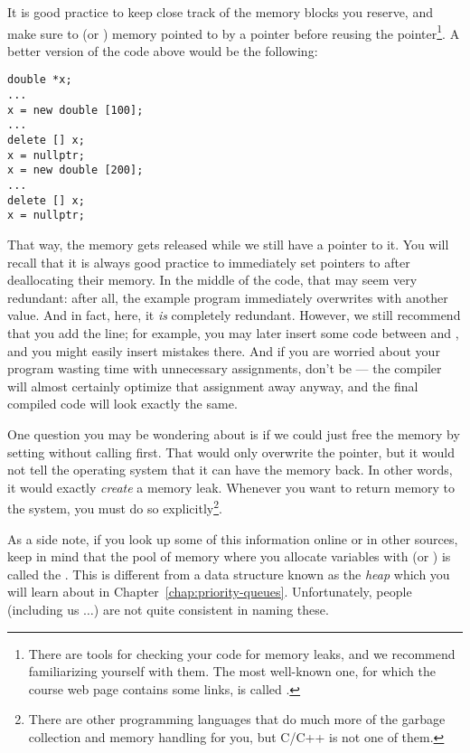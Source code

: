 It is good practice to keep close track of the memory blocks you
reserve, and make sure to  (or ) memory
pointed to by a pointer before reusing the pointer\footnote{There are tools
for checking your code for memory leaks, and we recommend
familiarizing yourself with them. The most well-known one, for which
the course web page contains some links, is called .}.
A better version of the code above would be the following:

\begin{verbatim}
double *x;
...
x = new double [100];
...
delete [] x;
x = nullptr;
x = new double [200];
...
delete [] x;
x = nullptr;
\end{verbatim}

That way, the memory gets released while we still have a pointer to
it.
You will recall that it is always good practice to immediately set
pointers to  after deallocating their memory.
In the middle of the code, that may seem very redundant:
after all, the example program immediately overwrites  with
another value. 
And in fact, here, it \emph{is} completely redundant.
However, we still recommend that you add the line;
for example, you may later insert some code between 
and , and you might easily insert mistakes there.
And if you are worried about your program wasting time with
unnecessary assignments, don't be --- the compiler will almost certainly
optimize that assignment away anyway, and the final compiled code will look
exactly the same.

One question you may be wondering about is if we could just free the
memory by setting 
without calling  first.
That would only overwrite the pointer, but it would not tell the
operating system that it can have the memory back.
In other words, it would exactly \emph{create} a memory leak.
Whenever you want to return memory to the system, you must do so
explicitly\footnote{There are other programming languages that do much
  more of the garbage collection and memory handling for you,
  but C/C++ is not one of them.}. 

As a side note, if you look up some of this information online or in
other sources, keep in mind that the pool of memory where you allocate
variables with  (or ) is called the
.
This is different from a data structure known as the \emph{heap} which
you will learn about in Chapter~\ref{chap:priority-queues}.
Unfortunately, people (including us $\ldots$) are not quite consistent
in naming these.
